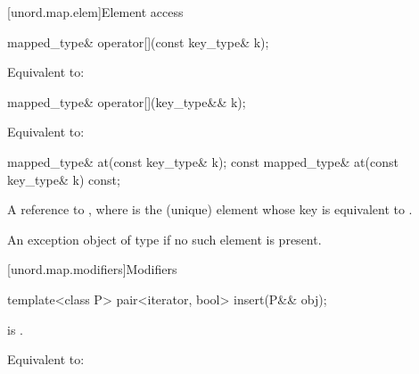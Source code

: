 [unord.map.elem]{Element access}

%
%
\begin{itemdecl}
mapped_type& operator[](const key_type& k);
\end{itemdecl}

\begin{itemdescr}
\pnum
\effects
Equivalent to: 
\end{itemdescr}

%
%
\begin{itemdecl}
mapped_type& operator[](key_type&& k);
\end{itemdecl}

\begin{itemdescr}
\pnum
\effects
Equivalent to: 
\end{itemdescr}

%
%
\begin{itemdecl}
mapped_type& at(const key_type& k);
const mapped_type& at(const key_type& k) const;
\end{itemdecl}

\begin{itemdescr}
\pnum
\returns
A reference to , where  is the (unique) element whose key is equivalent to .

\pnum
\throws
An exception object of type  if no such element is present.
\end{itemdescr}

[unord.map.modifiers]{Modifiers}

%
\begin{itemdecl}
template<class P>
  pair<iterator, bool> insert(P&& obj);
\end{itemdecl}

\begin{itemdescr}

\pnum
\constraints
{} is .

\pnum
\effects
Equivalent to: 
\end{itemdescr}

